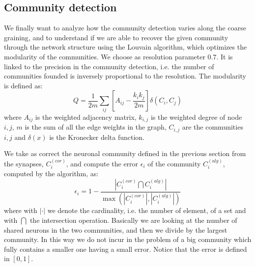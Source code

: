 \subsection{Community detection}
We finally want to analyze how the community detection varies along the coarse 
graining, and to understand if we are able to recover the given community through
the network structure using the Louvain algorithm, which optimizes the modularity
of the communities. We choose as resolution parameter $0.7$. It is 
linked to the precision in the community detection, i.e. the number 
of communities founded is inversely proportional to the resolution.
The modularity is defined as:
\begin{equation}
    Q = \frac{1}{2m}\sum_{ij} \left[A_{ij}-\frac{k_ik_j}{2m}\right] \delta(C_i, C_j)
\end{equation}
where $A_{ij}$ is the weighted adjacency matrix, $k_{i,j}$ is the weighted degree of node $i,j$,
$m$ is the sum of all the edge weights in the graph, $C_{i,j}$ are the communities $i,j$ and $\delta(x)$ is the
Kronecker delta function.

We take as correct the neuronal community defined in the previous section from the synapses,
$C_i^{(cor)}$, and compute the error $\epsilon_i$ of the community $C_i^{(alg)}$, computed by
the algorithm, as:
\begin{equation} \label{eq:com_er}
    \epsilon_i = 1- \frac{\left|C_i^{(cor)} \bigcap C_i^{(alg)}\right| }{\max{\left(\left|C_i^{(cor)}\right|, \left|C_i^{(alg)}\right|\right)}}
\end{equation}
where with $|\cdot|$ we denote the cardinality, i.e. the number of element, of a set and with $\bigcap$
the intersection operation. Basically we are looking at the number of shared neurons in the two communities, 
and then we divide by the largest community. In this way we do not incur in the problem 
of a big community which fully contains a smaller one having a small error. 
Notice that the error is defined in $[0,1]$.

